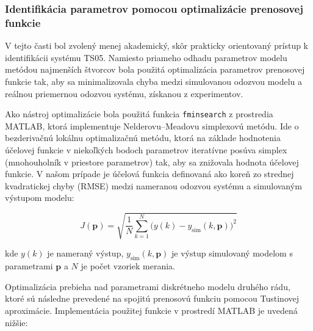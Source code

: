 \subsubsection{Identifikácia parametrov pomocou optimalizácie prenosovej funkcie}

V tejto časti bol zvolený menej akademický, skôr prakticky orientovaný prístup k identifikácii systému TS05.  
Namiesto priameho odhadu parametrov modelu metódou najmenších štvorcov bola použitá optimalizácia parametrov prenosovej funkcie tak,  
aby sa minimalizovala chyba medzi simulovanou odozvou modelu a reálnou priemernou odozvou systému, získanou z experimentov.

Ako nástroj optimalizácie bola použitá funkcia \texttt{fminsearch} z prostredia MATLAB,  
ktorá implementuje Nelderovu–Meadovu simplexovú metódu.  
Ide o bezderivačnú lokálnu optimalizačnú metódu, ktorá na základe hodnotenia účelovej funkcie v niekoľkých bodoch parametrov iteratívne posúva simplex (mnohouholník v priestore parametrov) tak, aby sa znižovala hodnota účelovej funkcie.  
V našom prípade je účelová funkcia definovaná ako koreň zo strednej kvadratickej chyby (RMSE) medzi nameranou odozvou systému a simulovaným výstupom modelu:

\begin{equation}
    J(\mathbf{p}) = 
    \sqrt{
        \frac{1}{N} 
        \sum_{k=1}^{N} 
        \bigl(y(k) - y_{\text{sim}}(k,\mathbf{p})\bigr)^2
    }
    \label{eq:rmse_function}
\end{equation}

kde $y(k)$ je nameraný výstup, $y_{\text{sim}}(k,\mathbf{p})$ je výstup simulovaný modelom s parametrami $\mathbf{p}$  
a $N$ je počet vzoriek merania.

Optimalizácia prebieha nad parametrami diskrétneho modelu druhého rádu, ktoré sú následne prevedené na spojitú prenosovú funkciu pomocou Tustinovej aproximácie.  
Implementácia použitej funkcie v prostredí MATLAB je uvedená nižšie:

